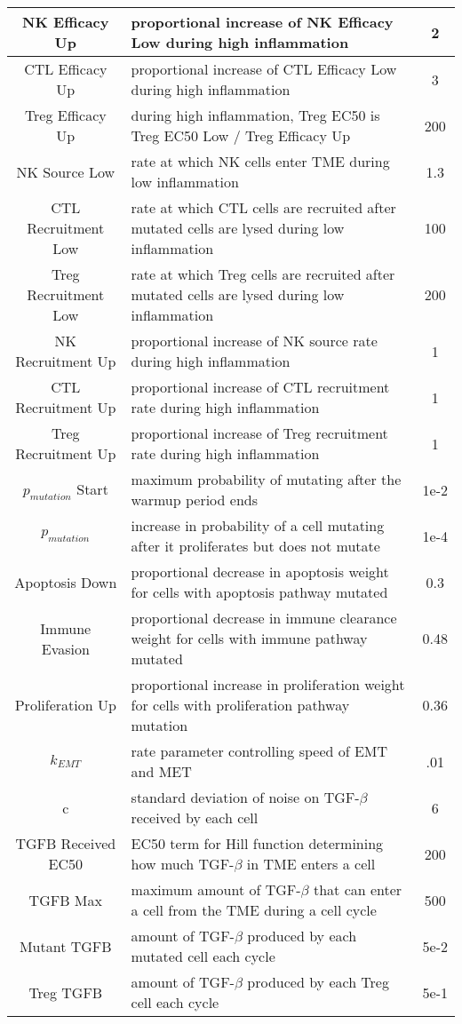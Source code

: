 \documentclass[11pt, a4paper, preprint]{article}
\begin{document}
\begin{center}
\begin{longtable}{||c | p{10cm} | c||}
  \hline
  NK Efficacy Up & proportional increase of NK Efficacy Low during high inflammation & 2 \\
  \hline
  CTL Efficacy Up & proportional increase of CTL Efficacy Low during high inflammation & 3 \\
  \hline
  Treg Efficacy Up & during high inflammation, Treg EC50 is Treg EC50 Low / Treg Efficacy Up & 200 \\
  \hline
  NK Source Low & rate at which NK cells enter TME during low inflammation & 1.3 \\ 
  \hline
  CTL Recruitment Low & rate at which CTL cells are recruited after mutated cells are lysed during low inflammation & 100 \\ 
  \hline
  Treg Recruitment Low & rate at which Treg cells are recruited after mutated cells are lysed during low inflammation & 200 \\
  \hline
  NK Recruitment Up & proportional increase of NK source rate during high inflammation & 1 \\
  \hline
  CTL Recruitment Up & proportional increase of CTL recruitment rate during high inflammation & 1 \\
  \hline
   Treg Recruitment Up & proportional increase of Treg recruitment rate during high inflammation & 1 \\
  \hline
  $p_{mutation}$ Start & maximum probability of mutating after the warmup period ends & 1e-2 \\
  \hline
  $p_{mutation}$ & increase in probability of a cell mutating after it proliferates but does not mutate & 1e-4 \\
  \hline
  Apoptosis Down & proportional decrease in apoptosis weight for cells with apoptosis pathway mutated & 0.3 \\
  \hline
  Immune Evasion & proportional decrease in immune clearance weight for cells with immune pathway mutated & 0.48 \\
  \hline
  Proliferation Up & proportional increase in proliferation weight for cells with proliferation pathway mutation & 0.36 \\
  \hline
  $k_{EMT}$ & rate parameter controlling speed of EMT and MET & .01 \\
  \hline
  c & standard deviation of noise on TGF-$\beta$ received by each cell & 6 \\
  \hline
  TGFB Received EC50 & EC50 term for Hill function determining how much TGF-$\beta$ in TME enters a cell & 200 \\
  \hline
  TGFB Max & maximum amount of TGF-$\beta$ that can enter a cell from the TME during a cell cycle & 500 \\
  \hline 
  Mutant TGFB & amount of TGF-$\beta$ produced by each mutated cell each cycle & 5e-2 \\
  \hline
  Treg TGFB & amount of TGF-$\beta$ produced by each Treg cell each cycle & 5e-1 \\
  \hline
\end{longtable}
\end{center}
\end{document}
